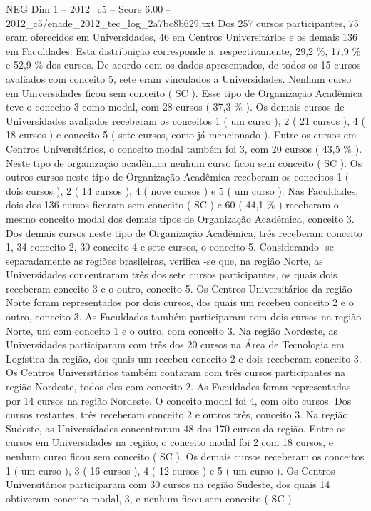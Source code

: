 \begin{textsample}{NEG Dim 1 – 2012\_c5 – Score 6.00 – 2012\_c5/enade\_2012\_tec\_log\_2a7bc8b629.txt}
Dos 257 cursos participantes, 75 eram oferecidos em Universidades, 46 em Centros Universitários e os demais 136 em Faculdades.
Esta distribuição corresponde a, respectivamente, 29,2 \%, 17,9 \% e 52,9 \% dos cursos.
De acordo com os dados apresentados, de todos os 15 cursos avaliados com conceito 5, sete eram vinculados a Universidades.
Nenhum curso em Universidades ficou sem conceito ( SC ).
Esse tipo de Organização Acadêmica teve o conceito 3 como modal, com 28 cursos ( 37,3 \% ).
Os demais cursos de Universidades avaliados receberam os conceitos 1 ( um curso ), 2 ( 21 cursos ), 4 ( 18 cursos ) e conceito 5 ( sete cursos, como já mencionado ).
Entre os cursos em Centros Universitários, o conceito modal também foi 3, com 20 cursos ( 43,5 \% ).
Neste tipo de organização acadêmica nenhum curso ficou sem conceito ( SC ).
Os outros cursos neste tipo de Organização Acadêmica receberam os conceitos 1 ( dois cursos ), 2 ( 14 cursos ), 4 ( nove cursos ) e 5 ( um curso ).
Nas Faculdades, dois dos 136 cursos ficaram sem conceito ( SC ) e 60 ( 44,1 \% ) receberam o mesmo conceito modal dos demais tipos de Organização Acadêmica, conceito 3.
Dos demais cursos neste tipo de Organização Acadêmica, três receberam conceito 1, 34 conceito 2, 30 conceito 4 e sete cursos, o conceito 5.
Considerando -se separadamente as regiões brasileiras, verifica -se que, na região Norte, as Universidades concentraram três dos sete cursos participantes, os quais dois receberam conceito 3 e o outro, conceito 5.
Os Centros Universitários da região Norte foram representados por dois cursos, dos quais um recebeu conceito 2 e o outro, conceito 3.
As Faculdades também participaram com dois cursos na região Norte, um com conceito 1 e o outro, com conceito 3.
Na região Nordeste, as Universidades participaram com três dos 20 cursos na Área de Tecnologia em Logística da região, dos quais um recebeu conceito 2 e dois receberam conceito 3.
Os Centros Universitários também contaram com três cursos participantes na região Nordeste, todos eles com conceito 2.
As Faculdades foram representadas por 14 cursos na região Nordeste.
O conceito modal foi 4, com oito cursos.
Dos cursos restantes, três receberam conceito 2 e outros três, conceito 3.
Na região Sudeste, as Universidades concentraram 48 dos 170 cursos da região.
Entre os cursos em Universidades na região, o conceito modal foi 2 com 18 cursos, e nenhum curso ficou sem conceito ( SC ).
Os demais cursos receberam os conceitos 1 ( um curso ), 3 ( 16 cursos ), 4 ( 12 cursos ) e 5 ( um curso ).
Os Centros Universitários participaram com 30 cursos na região Sudeste, dos quais 14 obtiveram conceito modal, 3, e nenhum ficou sem conceito ( SC ).

\end{textsample}
